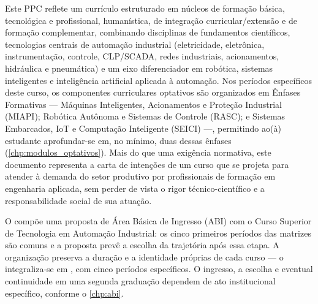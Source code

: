 Este PPC reflete um currículo estruturado em núcleos de formação básica, tecnológica e profissional, humanística, de integração curricular/extensão e de formação complementar, combinando disciplinas de fundamentos científicos, tecnologias centrais de automação industrial (eletricidade, eletrônica, instrumentação, controle, CLP/SCADA, redes industriais, acionamentos, hidráulica e pneumática) e um eixo diferenciador em robótica, sistemas inteligentes e inteligência artificial aplicada à automação. Nos períodos específicos deste curso, os componentes curriculares optativos são organizados em Ênfases Formativas — Máquinas Inteligentes, Acionamentos e Proteção Industrial (MIAPI); Robótica Autônoma e Sistemas de Controle (RASC); e Sistemas Embarcados, IoT e Computação Inteligente (SEICI) —, permitindo ao(à) estudante aprofundar-se em, no mínimo, duas dessas ênfases (\autoref{chp:modulos_optativos}). Mais do que uma exigência normativa, este documento representa a carta de intenções de um curso que se projeta para atender à demanda do setor produtivo por profissionais de formação em engenharia aplicada, sem perder de vista o rigor técnico-científico e a responsabilidade social de sua atuação.

O \ppccurso compõe uma proposta de Área Básica de Ingresso (ABI) com o Curso Superior de Tecnologia em Automação Industrial: os cinco primeiros períodos das matrizes são comuns e a proposta prevê a escolha da trajetória após essa etapa. A organização preserva a duração e a identidade próprias de cada curso — o \ppccurso integraliza-se em \ppctempominimo, com cinco períodos específicos. O ingresso, a escolha e eventual continuidade em uma segunda graduação dependem de ato institucional específico, conforme o \autoref{chp:abi}.
